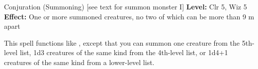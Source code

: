 {Conjuration (Summoning) [see text for summon monster I]}
{
	\textbf{Level:}
	Clr 5, Wiz 5\\
	\textbf{Effect:}
	One or more summoned creatures, no two of which can be more than 9 m apart\\
}
{
	This spell functions like , except that you can summon one creature from the 5th-level list, 1d3 creatures of the same kind from the 4th-level list, or 1d4+1 creatures of the same kind from a lower-level list.

}
